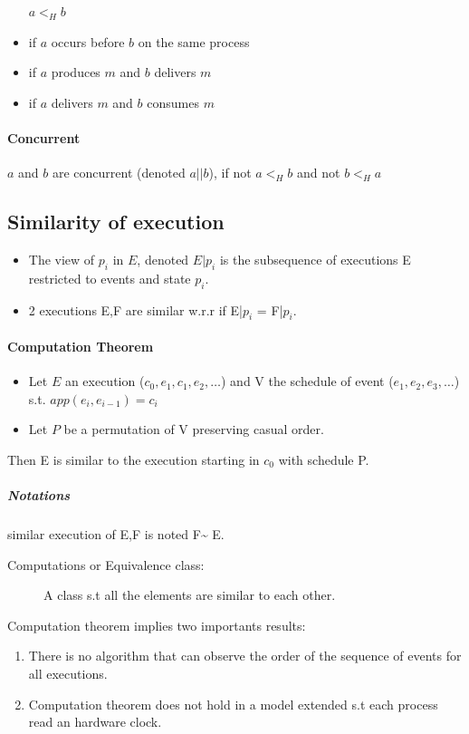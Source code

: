 \begin{itemize}
    \item[$ a <_H b $]
    \item if $a$ occurs before $b$ on the same process
    \item if $a$ produces $m$ and $b$ delivers $m$
    \item if $a$ delivers $m$ and $b$ consumes $m$
\end{itemize}

\paragraph{Concurrent}
$a$ and $b$ are concurrent (denoted $a || b$), if not $a <_H b$ and not $b <_H a$

\subsection{Similarity of execution}
\begin{itemize}
	\item The view of $p_i$ in $E$, denoted $E|p_i$ is the subsequence
	of executions E restricted to events and state $p_i$.
	\item 2 executions E,F are similar w.r.r if E|$p_i$ = F|$p_i$.
\end{itemize}
\paragraph{Computation Theorem}
\begin{itemize}
	\item Let $E$ an execution ($c_0,e_1,c_1,e_2,\ldots$) and V the
	schedule of event ($e_1,e_2,e_3,\ldots$) s.t. $app(e_i,e_{i-1})=c_i$
	\item Let $P$ be a permutation of V preserving casual order.
\end{itemize}
Then E is similar to the execution starting in $c_0$ with schedule P.
\subparagraph{Notations}
similar execution of E,F is noted F\textasciitilde{} E.
\begin{description}
	\item[Computations or Equivalence class:] A class s.t all the elements
are similar to each other.
\end{description}
Computation theorem implies two importants results:
\begin{enumerate}
	\item There is no algorithm that can observe the order of the sequence
	of events for all executions. %
	\item Computation theorem does not hold in a model extended s.t each
	process read an hardware clock.%
\end{enumerate}
